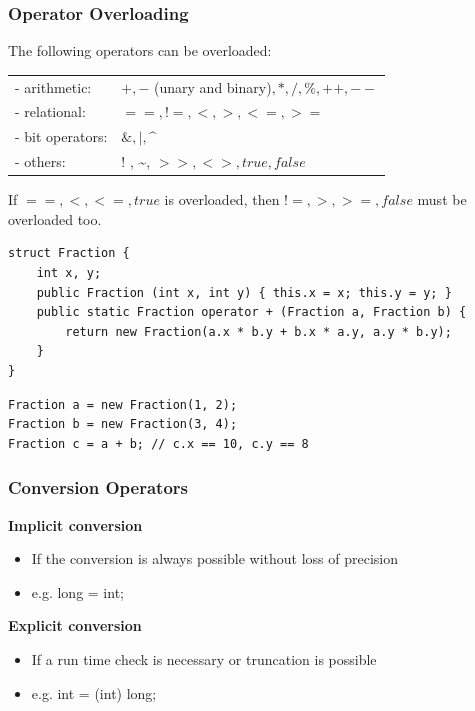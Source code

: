 \newpage
\subsubsection{Operator Overloading}
The following operators can be overloaded:\\
\begin{multicols}{2}
	\begin{tabular}{lp{5cm}}
		- arithmetic:    & $+, -$ (unary and binary)$ , *, /,\%, ++, -- $ \\
		- relational:    & $==, !=, <, >, <=, >=$                       \\
		- bit operators: & $\&,|, \text{\textasciicircum}$              \\
		- others:        & $!$ , \textasciitilde, $>>,<>, true, false$  \\
	\end{tabular}

\columnbreak
  If $==, <, <=, true$ is overloaded, then $!=, >, >=, false$ must be overloaded too.

\end{multicols}	
	
\begin{multicols}{2}
\begin{lstlisting}
struct Fraction {
	int x, y;
	public Fraction (int x, int y) { this.x = x; this.y = y; }
	public static Fraction operator + (Fraction a, Fraction b) {
		return new Fraction(a.x * b.y + b.x * a.y, a.y * b.y);
	}
}
\end{lstlisting}
\columnbreak
\begin{lstlisting}
Fraction a = new Fraction(1, 2);
Fraction b = new Fraction(3, 4);
Fraction c = a + b; // c.x == 10, c.y == 8
\end{lstlisting}
\end{multicols}

\subsubsection{Conversion Operators}
\begin{multicols}{2}
\textbf{Implicit conversion}
\begin{itemize}
	\item If the conversion is always possible without loss of precision
	\item e.g. long = int;
\end{itemize}
\columnbreak
\textbf{Explicit conversion}
\begin{itemize}
	\item If a run time check is necessary or truncation is possible
	\item e.g. int = (int) long;
\end{itemize}
\end{multicols}


